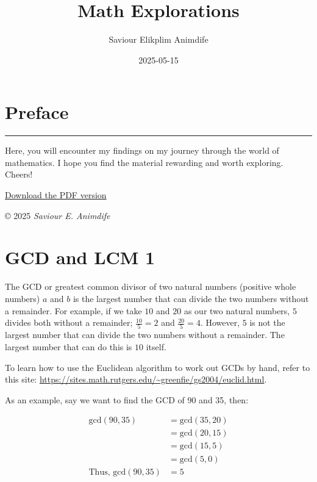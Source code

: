 \documentclass[
]{book}
\title{Math Explorations}
\author{Saviour Elikplim Animdife}
\date{2025-05-15}
\begin{document}
\maketitle

{
\setcounter{tocdepth}{1}
\tableofcontents
}
\chapter*{Preface}\label{preface}

\begin{center}\rule{0.5\linewidth}{0.5pt}\end{center}

Here, you will encounter my findings on my journey through the world of mathematics. I hope you find the material rewarding and worth exploring. Cheers!

\href{https://github.com/sneurocode/math-explorations/blob/master/docs/_main.pdf}{Download the PDF version}

© 2025 \emph{Saviour E. Animdife}

\chapter{GCD and LCM 1}\label{gcd-and-lcm-1}

The GCD or greatest common divisor of two natural numbers (positive whole numbers) \(a\) and \(b\) is the largest number that can divide the two numbers without a remainder. For example, if we take \(10\) and \(20\) as our two natural numbers, \(5\) divides both without a remainder; \(\frac{10}{5} = 2\) and \(\frac{20}{5} = 4\). However, \(5\) is not the largest number that can divide the two numbers without a remainder. The largest number that can do this is \(10\) itself.

To learn how to use the Euclidean algorithm to work out GCDs by hand, refer to this site: \url{https://sites.math.rutgers.edu/~greenfie/gs2004/euclid.html}.

As an example, say we want to find the GCD of 90 and 35, then:

\[
\begin{aligned}
\text{gcd}(90, 35) &= \text{gcd}(35, 20) \\
&= \text{gcd}(20, 15) \\
&= \text{gcd}(15, 5) \\
&= \text{gcd}(5, 0) \\
\text{Thus, gcd}(90, 35) &= 5
\end{aligned}
\]
\end{document}
